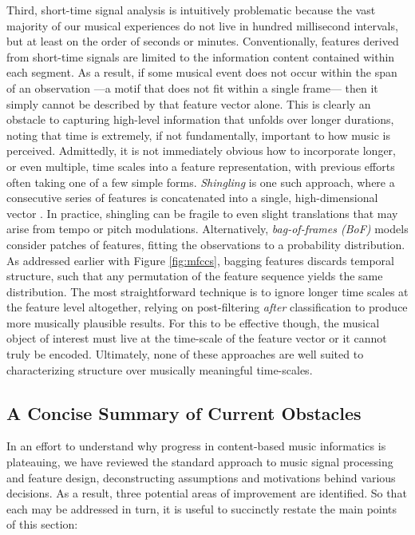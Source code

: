 Third, short-time signal analysis is intuitively problematic because the vast majority of our musical experiences do not live in hundred millisecond intervals, but at least on the order of seconds or minutes.
Conventionally, features derived from short-time signals are limited to the information content contained within each segment.
As a result, if some musical event does not occur within the span of an observation ---a motif that does not fit within a single frame--- then it simply cannot be described by that feature vector alone.
This is clearly an obstacle to capturing high-level information that unfolds over longer durations, noting that time is extremely, if not fundamentally, important to how music is perceived.
Admittedly, it is not immediately obvious how to incorporate longer, or even multiple, time scales into a feature representation, with previous efforts often taking one of a few simple forms.
\emph{Shingling} is one such approach, where a consecutive series of features is concatenated into a single, high-dimensional vector \cite{Casey2008}.
In practice, shingling can be fragile to even slight translations that may arise from tempo or pitch modulations.
Alternatively, \emph{bag-of-frames (BoF)} models consider patches of features, fitting the observations to a probability distribution.
As addressed earlier with Figure \ref{fig:mfccs}, bagging features discards temporal structure, such that any permutation of the feature sequence yields the same distribution.
The most straightforward technique is to ignore longer time scales at the feature level altogether, relying on post-filtering \emph{after} classification to produce more musically plausible results.
For this to be effective though, the musical object of interest must live at the time-scale of the feature vector or it cannot truly be encoded.
Ultimately, none of these approaches are well suited to characterizing structure over musically meaningful time-scales.


\subsection{A Concise Summary of Current Obstacles} 
\label{sec:obstacles}
In an effort to understand why progress in content-based music informatics is plateauing, we have reviewed the standard approach to music signal processing and feature design, deconstructing assumptions and motivations behind various decisions. 
As a result, three potential areas of improvement are identified.
So that each may be addressed in turn, it is useful to succinctly restate the main points of this section:

